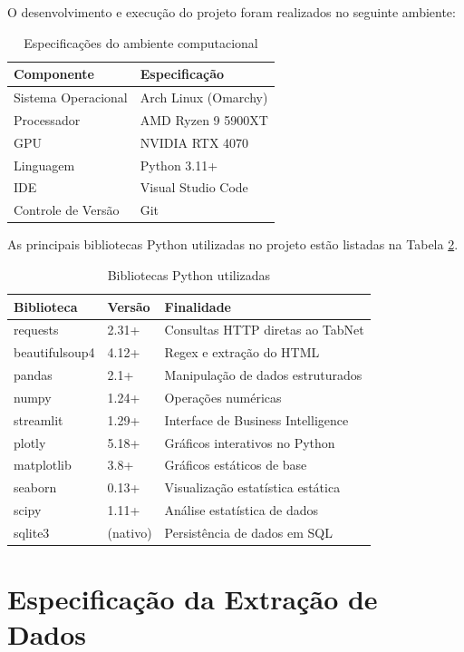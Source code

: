 \documentclass[
    12pt,
    oneside,
    a4paper,
    chapter=TITLE,
    section=TITLE
]{abntex2}
\begin{document}
O desenvolvimento e execução do projeto foram realizados no seguinte ambiente:

\begin{table}[H]
\centering
\caption{Especificações do ambiente computacional}
\label{tab:ambiente}
\begin{tabular}{ll}
\toprule
\textbf{Componente} & \textbf{Especificação} \\
\midrule
Sistema Operacional & Arch Linux (Omarchy) \\
Processador & AMD Ryzen 9 5900XT \\
GPU & NVIDIA RTX 4070 \\
Linguagem & Python 3.11+ \\
IDE & Visual Studio Code \\
Controle de Versão & Git \\
\bottomrule
\end{tabular}
\end{table}

As principais bibliotecas Python utilizadas no projeto estão listadas na Tabela \ref{tab:libs}.

\begin{table}[H]
\centering
\caption{Bibliotecas Python utilizadas}
\label{tab:libs}
\begin{tabular}{lll}
\toprule
\textbf{Biblioteca} & \textbf{Versão} & \textbf{Finalidade} \\
\midrule
requests & 2.31+ & Consultas HTTP diretas ao TabNet \\
beautifulsoup4 & 4.12+ & Regex e extração do HTML \\
pandas & 2.1+ & Manipulação de dados estruturados \\
numpy & 1.24+ & Operações numéricas \\
streamlit & 1.29+ & Interface de Business Intelligence \\
plotly & 5.18+ & Gráficos interativos no Python \\
matplotlib & 3.8+ & Gráficos estáticos de base \\
seaborn & 0.13+ & Visualização estatística estática \\
scipy & 1.11+ & Análise estatística de dados \\
sqlite3 & (nativo) & Persistência de dados em SQL \\
\bottomrule
\end{tabular}
\end{table}

\section{Especificação da Extração de Dados}
\end{document}
